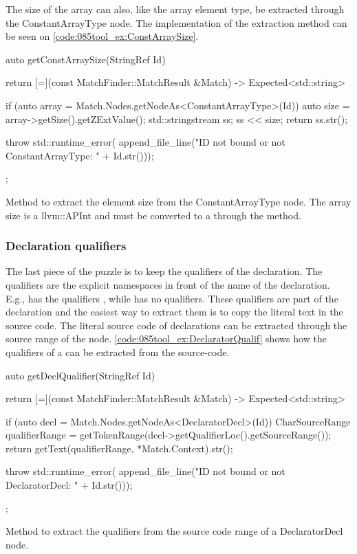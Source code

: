 The size of the array can also, like the array element type, be extracted through the ConstantArrayType node. The implementation of the extraction method can be seen on \cref{code:085tool_ex:ConstArraySize}.

\begin{listing}[H]
    \begin{cppcode}
auto getConstArraySize(StringRef Id) {
    return [=](const MatchFinder::MatchResult &Match) -> Expected<std::string> {
        if (auto array = Match.Nodes.getNodeAs<ConstantArrayType>(Id)) {
            auto size = array->getSize().getZExtValue();
            std::stringstream ss;
            ss << size;
            return ss.str();
        }

        throw std::runtime_error(
			    append_file_line("ID not bound or not ConstantArrayType: " + Id.str()));
    };
}
    \end{cppcode}
    \caption{Method to extract the element size from the ConstantArrayType node. The array size is a llvm::APInt and must be converted to a  through the  method.}
    \label{code:085tool_ex:ConstArraySize}
\end{listing}

\subsubsection*{Declaration qualifiers}

The last piece of the puzzle is to keep the qualifiers of the declaration. The qualifiers are the explicit namespaces in front of the name of the declaration. E.g.,  has the qualifiers , while  has no qualifiers. These qualifiers are part of the declaration and the easiest way to extract them is to copy the literal text in the source code. The literal source code of declarations can be extracted through the source range of the node. \cref{code:085tool_ex:DeclaratorQualif} shows how the qualifiers of a  can be extracted from the source-code.

\begin{listing}[H]
    \begin{cppcode}
auto getDeclQualifier(StringRef Id) {
    return [=](const MatchFinder::MatchResult &Match) -> Expected<std::string> {
        if (auto decl = Match.Nodes.getNodeAs<DeclaratorDecl>(Id)) {
            CharSourceRange qualifierRange = getTokenRange(decl->getQualifierLoc().getSourceRange());
            return getText(qualifierRange, *Match.Context).str();
        }

        throw std::runtime_error(
			    append_file_line("ID not bound or not DeclaratorDecl: " + Id.str()));
    };
}
    \end{cppcode}
    \caption{Method to extract the qualifiers from the source code range of a DeclaratorDecl node.}
    \label{code:085tool_ex:DeclaratorQualif}
\end{listing}

